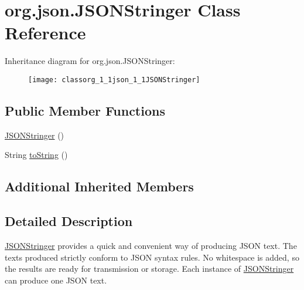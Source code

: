 \hypertarget{classorg_1_1json_1_1JSONStringer}{\section{org.\-json.\-J\-S\-O\-N\-Stringer Class Reference}
\label{classorg_1_1json_1_1JSONStringer}
}
Inheritance diagram for org.\-json.\-J\-S\-O\-N\-Stringer\-:\begin{figure}[H]
\begin{center}
\leavevmode
\texttt{[image: classorg\_1\_1json\_1\_1JSONStringer]}
\end{center}
\end{figure}
\subsection*{Public Member Functions}
\begin{DoxyCompactItemize}
\item 
\hyperlink{classorg_1_1json_1_1JSONStringer_a36d3accdcf3f40434edd9c33b414d3f9}{J\-S\-O\-N\-Stringer} ()
\item 
String \hyperlink{classorg_1_1json_1_1JSONStringer_a2e7f28e99eb46f767b5df8a669e774b4}{to\-String} ()
\end{DoxyCompactItemize}
\subsection*{Additional Inherited Members}


\subsection{Detailed Description}
\hyperlink{classorg_1_1json_1_1JSONStringer}{J\-S\-O\-N\-Stringer} provides a quick and convenient way of producing J\-S\-O\-N text. The texts produced strictly conform to J\-S\-O\-N syntax rules. No whitespace is added, so the results are ready for transmission or storage. Each instance of \hyperlink{classorg_1_1json_1_1JSONStringer}{J\-S\-O\-N\-Stringer} can produce one J\-S\-O\-N text. 

